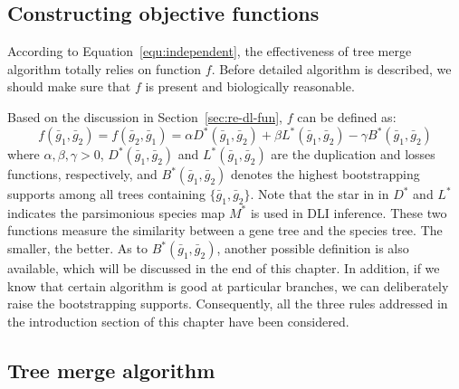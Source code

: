 \subsection{Constructing objective functions}\label{sec:merge-obj-fun}

According to Equation~\ref{equ:independent}, the effectiveness of tree merge algorithm
totally relies on function $f$. Before detailed algorithm is described, we should make
sure that $f$ is present and biologically reasonable.

Based on the discussion in Section~\ref{sec:re-dl-fun}, $f$ can be defined as:
\begin{equation}\label{equ:f-obj}
f(\bar{g}_1,\bar{g}_2)=f(\bar{g}_2,\bar{g}_1)=\alpha D^*(\bar{g}_1,\bar{g}_2)
	+\beta L^*(\bar{g}_1,\bar{g}_2)-\gamma B^*(\bar{g}_1,\bar{g}_2)
\end{equation}
where $\alpha,\beta,\gamma>0$, $D^*(\bar{g}_1,\bar{g}_2)$ and $L^*(\bar{g}_1,\bar{g}_2)$ are
the duplication and losses functions, respectively, and $B^*(\bar{g}_1,\bar{g}_2)$ denotes
the highest bootstrapping supports among all trees containing $\{\bar{g}_1,\bar{g}_2\}$.
Note that the star in in $D^*$ and $L^*$ indicates the parsimonious species map
$M^*$ is used in DLI inference. These two functions measure the similarity between
a gene tree and the species tree. The smaller, the better.
As to $B^*(\bar{g}_1,\bar{g}_2)$, another possible
definition is also available, which will be discussed in the end of this chapter.
In addition, if we know
that certain algorithm is good at particular branches, we can deliberately
raise the bootstrapping supports. Consequently, all the three rules addressed in
the introduction section of this chapter have been considered.

\subsection{Tree merge algorithm}

